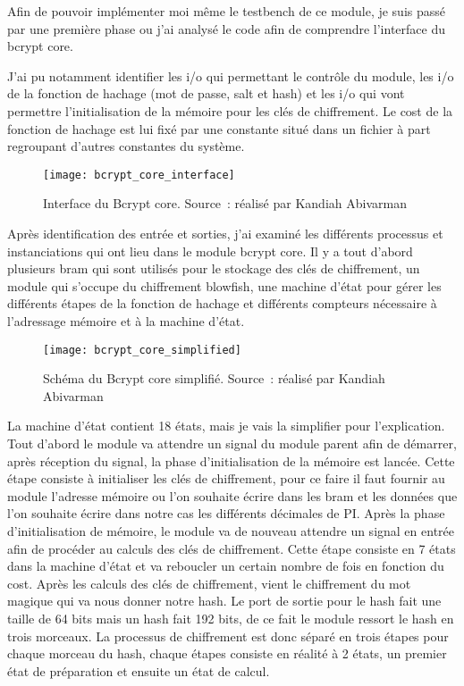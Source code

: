 Afin de pouvoir implémenter moi même le testbench de ce module, je suis passé par une première phase ou j'ai analysé le code afin de comprendre l'interface du bcrypt core.

J'ai pu notamment identifier les \gls{i/o} qui permettant le contrôle du module, les \gls{i/o} de la fonction de hachage (mot de passe, salt et hash) et les \gls{i/o} qui vont permettre l'initialisation de la mémoire pour les clés de chiffrement. Le cost de la fonction de hachage est lui fixé par une constante situé dans un fichier à part regroupant d'autres constantes du système.

\begin{figure}[tbph!]
	\centering
	\texttt{[image: bcrypt\_core\_interface]}
	\caption[Interface du Bcrypt core]{Interface du Bcrypt core. Source : réalisé par Kandiah Abivarman}
	\label{fig:bcrypt_core_interface}
\end{figure}


Après identification des entrée et sorties, j'ai examiné les différents processus et instanciations qui ont lieu dans le module bcrypt core. Il y a tout d'abord plusieurs \gls{bram} qui sont utilisés pour le stockage des clés de chiffrement, un module qui s'occupe du chiffrement blowfish, une machine d'état pour gérer les différents étapes de la fonction de hachage et différents compteurs nécessaire à l'adressage mémoire et à la machine d'état.

\newpage

\begin{figure}[tbph!]
	\centering
	\texttt{[image: bcrypt\_core\_simplified]}
	\caption[Schéma Bcrypt core simplifié]{Schéma du Bcrypt core simplifié. Source : réalisé par Kandiah Abivarman}
	\label{fig:bcrypt_core_simplified}
\end{figure}

La machine d'état contient 18 états, mais je vais la simplifier pour l'explication. Tout d'abord le module va attendre un signal du module parent afin de démarrer, après réception du signal, la phase d'initialisation de la mémoire est lancée. Cette étape consiste à initialiser les clés de chiffrement, pour ce faire il faut fournir au module l'adresse mémoire ou l'on souhaite écrire dans les \gls{bram} et les données que l'on souhaite écrire dans notre cas les différents décimales de PI. Après la phase d'initialisation de mémoire, le module va de nouveau attendre un signal en entrée afin de procéder au calculs des clés de chiffrement. Cette étape consiste en 7 états dans la machine d'état et va reboucler un certain nombre de fois en fonction du cost. Après les calculs des clés de chiffrement, vient le chiffrement du mot magique qui va nous donner notre hash. Le port de sortie pour le hash fait une taille de 64 bits mais un hash fait 192 bits, de ce fait le module ressort le hash en trois morceaux. La processus de chiffrement est donc séparé en trois étapes pour chaque morceau du hash, chaque étapes consiste en réalité à 2 états, un premier état de préparation et ensuite un état de calcul.

